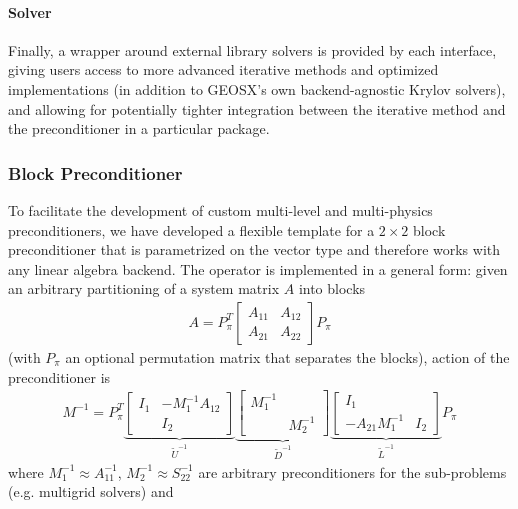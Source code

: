 \paragraph{Solver}
Finally, a wrapper around external library solvers is provided by each interface, giving users access to more advanced iterative methods and optimized implementations (in addition to GEOSX's own backend-agnostic Krylov solvers), and allowing for potentially tighter integration between the iterative method and the preconditioner in a particular package.

\subsubsection{Block Preconditioner}

To facilitate the development of custom multi-level and multi-physics preconditioners, we have developed a flexible template for a $2 \times 2$ block preconditioner that is parametrized on the vector type and therefore works with any linear algebra backend.   The operator is implemented in a general form: given an arbitrary partitioning of a system matrix $A$ into blocks
\begin{align}
  A = P_\pi^T
  \begin{bmatrix}
      A_{11} & A_{12} \\
      A_{21} & A_{22}
  \end{bmatrix}
  P_\pi
  \label{eq:block_precond_part}
\end{align}
(with $P_\pi$ an optional permutation matrix that separates the blocks), action of the preconditioner is 
\begin{align}
  M^{-1} = P_\pi^T
  \underbrace{\begin{bmatrix}
  I_{1} & -M_{1}^{-1}A_{12} \\
        &  I_{2}
  \end{bmatrix}}_{\widetilde{U}^{-1}}
  \underbrace{\begin{bmatrix}
  M_{1}^{-1} &            \\
             & M_{2}^{-1}
  \end{bmatrix}}_{\widetilde{D}^{-1}}
  \underbrace{\begin{bmatrix}
   I_{1}            &       \\
  -A_{21}M_{1}^{-1} & I_{2}
  \end{bmatrix}}_{\widetilde{L}^{-1}}
  P_\pi
  \label{eq:block_precond}
\end{align}
where $M_1^{-1} \approx A_{11}^{-1}$, $M_2^{-1} \approx S_{22}^{-1}$ are arbitrary preconditioners for the sub-problems (e.g. multigrid solvers) and
